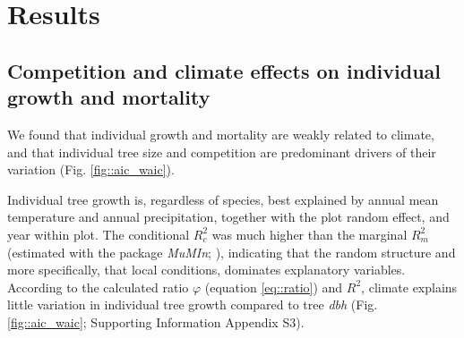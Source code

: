 \section{Results}

\subsection{Competition and climate effects on individual growth and mortality}

We found that individual growth and mortality are weakly related to climate, and that individual tree size and competition are predominant drivers of their variation (Fig. \ref{fig::aic_waic}).

Individual tree growth is, regardless of species, best explained by annual mean temperature and annual precipitation, together with the plot random effect, and year within plot. The conditional $ R_c^2 $ was much higher than the marginal $ R_m^2 $ (estimated with the package \textit{MuMIn}; \citet{MuMIn}), indicating that the random structure and more specifically, that local conditions, dominates explanatory variables. According to the calculated ratio $ \varphi $ (equation \ref{eq::ratio}) and $ R^2 $, climate explains little variation in individual tree growth compared to tree \textit{dbh} (Fig. \ref{fig::aic_waic}; Supporting Information Appendix S3).

